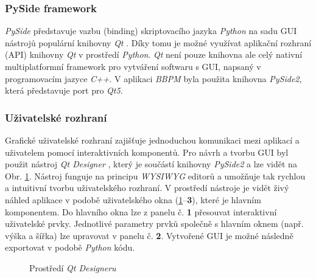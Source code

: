 \subsubsection{PySide framework}
\label{section:pyside}
\textit{PySide} představuje vazbu (binding) skriptovacího jazyka \textit{Python}
na sadu GUI nástrojů populární knihovny \textit{Qt} \cite{Qt}. Díky tomu je
možné využívat aplikační rozhraní (API) knihovny \textit{Qt} v prostředí
\textit{Python}. \textit{Qt} není pouze knihovna ale celý nativní
multiplatformní framework pro vytváření softwaru s GUI, napsaný v programovacím
jazyce \textit{C++}. V aplikaci \textit{BBPM} byla použita knihovna
\textit{PySide2}, která představuje port pro \textit{Qt5}.

\subsubsection{Uživatelské rozhraní}
\label{section:gui}
Grafické uživatelské rozhraní zajišťuje jednoduchou komunikaci mezi aplikací a
uživatelem pomocí interaktivních komponentů. Pro návrh a tvorbu GUI byl použit
nástroj \textit{Qt Designer} \cite{QtDesigner}, který je součástí knihovny
\textit{PySide2} a lze vidět na Obr. \ref{fig:qt_designer}. Nástroj funguje na
principu \textit{WYSIWYG} editorů a umožňuje tak rychlou a intuitivní tvorbu
uživatelského rozhraní. V prostředí nástroje je vidět živý náhled aplikace v
podobě uživatelského okna (\ref{fig:qt_designer}--\textbf{3}), které je hlavním
komponentem. Do hlavního okna lze z panelu č. \textbf{1} přesouvat interaktivní
uživatelské prvky. Jednotlivé parametry prvků společně s hlavním oknem (např.
výška a šířka) lze upravovat v panelu č. \textbf{2}. Vytvořené GUI je možné
následně exportovat v podobě \textit{Python} kódu.

\begin{figure}[h]
    \begin{center}
        \textcolor{black}{\fboxrule=0.5pt\fboxsep=0pt}
        \caption{Prostředí \textit{Qt Designeru}}
        \label{fig:qt_designer}
    \end{center}
\end{figure}

